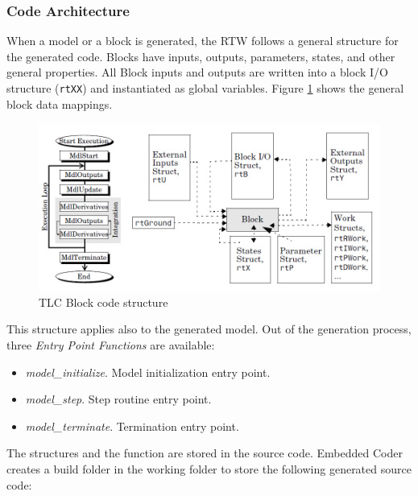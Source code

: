 \subsubsection{Code Architecture}
\label{sec:CodeArchitecture}
When a model or a block is generated, the RTW follows a general structure for the generated code. Blocks have inputs, outputs, parameters, states, and other general properties. All Block inputs and outputs are written into a block I/O structure (\verb|rtXX|) and instantiated as global variables. Figure \ref{fig:TLCCodeStructure} shows the general block data mappings.
\begin{figure}[htbp] 
\centering    
\includegraphics[width=1.0\textwidth]{TLCCodeStructure}
\caption{TLC Block code structure}
\label{fig:TLCCodeStructure}
\end{figure}
This structure applies also to the generated model. Out of the generation process, three \emph{Entry Point Functions} are available:%
\begin{itemize} 
\item \emph{model\_initialize}. Model initialization entry point.
\item \emph{model\_step}. Step routine entry point.
\item \emph{model\_terminate}. Termination entry point.
\end{itemize}
The structures and the function are stored in the source code. Embedded Coder creates a build folder in the working folder to store the following generated source code:
